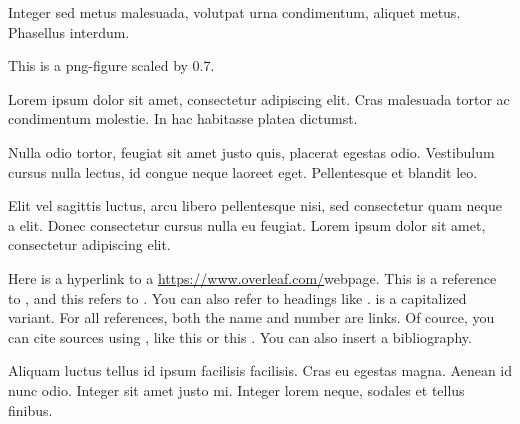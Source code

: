 \documentclass{thesis}
\begin{document}
Integer sed metus malesuada, volutpat urna condimentum, aliquet metus. Phasellus interdum.

    {This is a png-figure scaled by 0.7.}


Lorem ipsum dolor sit amet, consectetur adipiscing elit. Cras malesuada tortor ac condimentum molestie. In hac habitasse platea dictumst.


Nulla odio tortor, feugiat sit amet justo quis, placerat egestas odio. Vestibulum cursus nulla lectus, id congue neque laoreet eget. Pellentesque et blandit leo.


Elit vel sagittis luctus, arcu libero pellentesque nisi, sed consectetur quam neque a elit. Donec consectetur cursus nulla eu feugiat. Lorem ipsum dolor sit amet, consectetur adipiscing elit.


Here is a hyperlink to a \url{https://www.overleaf.com/}{webpage}. This is a reference to , and this refers to . You can also refer to headings like .  is a capitalized variant. For all references, both the name and number are links. Of cource, you can cite sources using \c{\cite{...}}, like this \cite{minted} or this \cite{tabularray}. You can also insert a bibliography.

Aliquam luctus tellus id ipsum facilisis facilisis. Cras eu egestas magna. Aenean id nunc odio. Integer sit amet justo mi. Integer lorem neque, sodales et tellus finibus.

\end{document}
